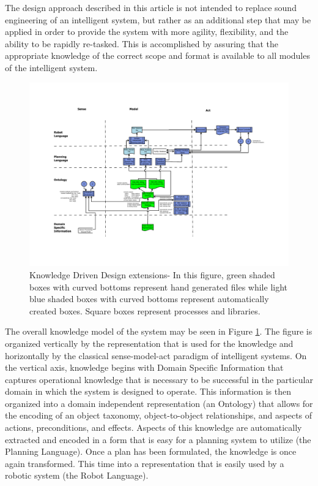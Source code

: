 The design approach described in this article is not intended to
replace sound engineering of an intelligent system, but rather as 
an additional step that may be applied in order to provide
the system with more agility, flexibility, and the ability to be rapidly
re-tasked. This is accomplished by assuring that the appropriate knowledge
of the correct scope and format is available to all modules of the
intelligent system.

\begin{figure}[ht!]
\begin{center}
\includegraphics[width=16cm]{images/KnowledgeDrivenRobotics.pdf}
\caption{Knowledge Driven Design extensions- In this figure, green shaded boxes with curved bottoms 
represent hand generated files while
light blue shaded boxes with curved bottoms represent automatically created boxes. Square
boxes represent processes and libraries.}
\label{fig:DesignArchitecture}
\end{center}
\end{figure}

The overall knowledge model of the system may be seen in Figure \ref{fig:DesignArchitecture}.
The figure is organized vertically by the representation that is used for the knowledge
and horizontally by the classical sense-model-act paradigm of intelligent systems.
On the vertical axis, knowledge begins with Domain Specific Information that captures
operational knowledge that is necessary to be successful in the particular domain in which
the system is designed to operate. This information is then organized into a domain
independent representation (an Ontology) that allows for the encoding of an object 
taxonomy, object-to-object
relationships, and aspects of actions, preconditions, and effects. 
Aspects of this
knowledge are automatically extracted and encoded in a form that is easy for
a planning system to utilize (the Planning Language). Once a plan has been formulated, the knowledge is once
again transformed. This time into a representation that is easily used by a robotic system
(the Robot Language).

